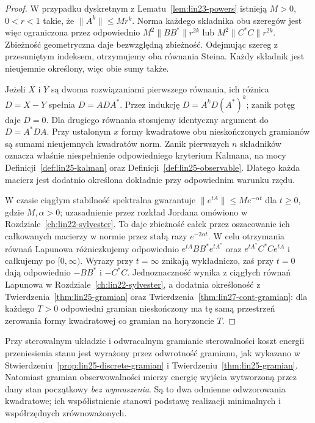\begin{proof}
W przypadku dyskretnym
z
Lematu~\ref{lem:lin23-powers}
istnieją \(M>0\), \(0<r<1\)
takie, że \(\|A^k\|\le Mr^k\).
Norma każdego składnika
obu szeregów jest więc
ograniczona przez
odpowiednio
\(M^2\|BB^*\|r^{2k}\)
lub \(M^2\|C^*C\|r^{2k}\).
Zbieżność geometryczna daje
bezwzględną zbieżność.
Odejmując szereg
z przesuniętym indeksem,
otrzymujemy oba równania Steina.
Każdy składnik jest nieujemnie
określony, więc obie sumy także.

Jeżeli \(X\) i \(Y\)
są dwoma rozwiązaniami
pierwszego równania,
ich różnica \(D=X-Y\)
spełnia \(D=ADA^*\).
Przez indukcję
\(D=A^kD(A^*)^k\);
zanik potęg daje \(D=0\).
Dla drugiego równania
stosujemy identyczny argument
do \(D=A^*DA\).
Przy ustalonym \(x\)
formy kwadratowe obu
nieskończonych gramianów
są sumami nieujemnych
kwadratów norm.
Zanik pierwszych \(n\)
składników oznacza
właśnie niespełnienie
odpowiedniego kryterium
Kalmana, na mocy
Definicji~\ref{def:lin25-kalman}
oraz
Definicji~\ref{def:lin25-observable}.
Dlatego każda macierz
jest dodatnio określona
dokładnie przy odpowiednim
warunku rzędu.

W czasie ciągłym
stabilność spektralna
gwarantuje
\(\|e^{tA}\|\le Me^{-\alpha t}\)
dla \(t\ge0\),
gdzie \(M,\alpha>0\);
uzasadnienie przez
rozkład Jordana omówiono
w Rozdziale~\ref{ch:lin22-sylvester}.
To daje zbieżność całek
przez oszacowanie
ich całkowanych macierzy
w normie przez
stałą razy \(e^{-2\alpha t}\).
W celu otrzymania równań
Lapunowa różniczkujemy
odpowiednio
\(e^{tA}BB^*e^{tA^*}\)
oraz
\(e^{tA^*}C^*Ce^{tA}\)
i całkujemy po \([0,\infty)\).
Wyrazy przy \(t=\infty\)
znikają wykładniczo,
zaś przy \(t=0\) dają
odpowiednio \(-BB^*\)
i \(-C^*C\).
Jednoznaczność wynika z
ciągłych równań Lapunowa
w
Rozdziale~\ref{ch:lin22-sylvester},
a dodatnia określoność
z
Twierdzenia~\ref{thm:lin25-gramian}
oraz
Twierdzenia~\ref{thm:lin27-cont-gramian}:
dla każdego \(T>0\)
odpowiedni gramian
nieskończony ma tę samą
przestrzeń zerowania
formy kwadratowej
co gramian na horyzoncie \(T\).
\end{proof}

\begin{uwaga}
\label{rem:lin27-energy}
Przy sterowalnym układzie
i odwracalnym gramianie
sterowalności koszt energii
przeniesienia stanu jest
wyrażony przez odwrotność
gramianu, jak wykazano
w
Stwierdzeniu~\ref{prop:lin25-discrete-gramian}
i
Twierdzeniu~\ref{thm:lin25-gramian}.
Natomiast gramian
obserwowalności mierzy
energię wyjścia wytworzoną
przez dany stan początkowy
\emph{bez wymuszenia}.
Są to dwa odmienne
odwzorowania kwadratowe;
ich współistnienie stanowi
podstawę realizacji minimalnych
i współrzędnych zrównoważonych.
\end{uwaga}

